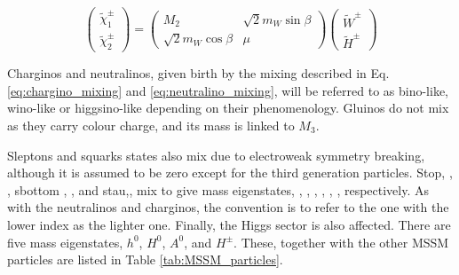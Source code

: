 				\begin{equation}
				\label{eq:chargino_mixing}
						\begin{pmatrix}  \tilde{\chi}^{\pm}_1 \\ \tilde{\chi}^{\pm}_2 \end{pmatrix}	
						= 
						\begin{pmatrix}
							M_2 & \sqrt{2} m_W \sin \beta \\
							\sqrt{2} m_W \cos \beta & \mu  
						\end{pmatrix}
						\begin{pmatrix}
							\tilde{W}^{\pm} \\
							\tilde{H}^{\pm}
						\end{pmatrix}
				\end{equation}

				Charginos and neutralinos, given birth by the mixing described in Eq. \ref{eq:chargino_mixing} and \ref{eq:neutralino_mixing}, will be referred to as bino-like, wino-like or higgsino-like depending on their phenomenology. Gluinos do not mix as they carry colour charge, and its mass is linked to $M_3$. 

				Sleptons and squarks states also mix due to electroweak symmetry breaking, although it is assumed to be zero except for the third generation particles. Stop, \stopL, \stopR, sbottom \sbottomL, \sbottomR, and stau,\stauL, \stauR mix to give mass eigenstates, \stopone, \stoptwo, \sbottomone, \sbottomtwo, \stauone, \stautwo, respectively. As with the neutralinos and charginos, the convention is to refer to the one with the lower index as the lighter one. Finally, the Higgs sector is also affected. There are five mass eigenstates, $h^0$, $H^0$, $A^0$, and $H^{\pm}$. These, together with the other MSSM particles are listed in Table \ref{tab:MSSM_particles}. 


